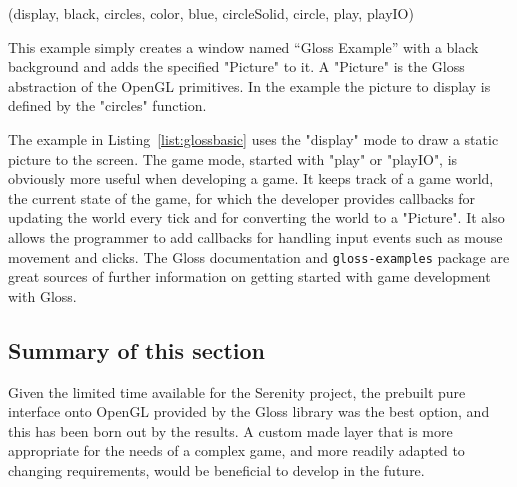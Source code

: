 \functions(display, black, circles, color, blue, circleSolid, circle, play, playIO)
\noindent
This example simply creates a window named ``Gloss Example'' with a black background and adds the specified "Picture" to it. A "Picture" is the Gloss abstraction of the OpenGL primitives. In the example the picture to display is defined by the "circles" function.

The example in Listing~\ref{list:glossbasic} uses the "display" mode to draw a static picture to the screen. The game mode, started with "play" or "playIO", is obviously more useful when developing a game. It keeps track of a game world, the current state of the game, for which the developer provides callbacks for updating the world every tick and for converting the world to a "Picture". It also allows the programmer to add callbacks for handling input events such as mouse movement and clicks. The Gloss documentation and \texttt{gloss-examples} package are great sources of further information on getting started with game development with Gloss.

\subsection{Summary of this section} 
Given the limited time available for the Serenity project, the prebuilt pure interface onto OpenGL provided by the Gloss library was the best option, and this has been born out by the results. A custom made layer that is more appropriate for the needs of a complex game, and more readily adapted to changing requirements, would be beneficial to develop in the future.
